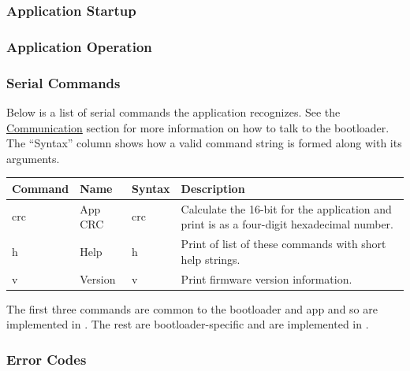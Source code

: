 \documentclass{article}
\begin{document}
\subsubsection{Application Startup} \label{sssec:FWAppStartup}

\subsubsection{Application Operation} \label{sssec:FWAppOperation}

\subsubsection{Serial Commands} \label{sssec:FWAppCommands}
Below is a list of serial commands the application recognizes.  See the
\hyperref[ssec:FWComm]{Communication} section for more information on how to talk to the bootloader.
The ``Syntax'' column shows how a valid command string is formed along with its arguments.

\begin{center}
    \begin{tabular}{l|l|l|p{}}
        Command & Name & Syntax & Description \\
        \hline
        crc & App CRC & crc & Calculate the 16-bit for the application and print is as a four-digit
        hexadecimal number. \\
        h & Help & h & Print of list of these commands with short help strings. \\
        v & Version & v & Print firmware version information. \\
    \end{tabular}
\end{center}

The first three commands are common to the bootloader and app and so are implemented in
.  The rest are bootloader-specific and are implemented in
.

\subsubsection{Error Codes} \label{sssec:FWBootStatusCodes}
\end{document}
